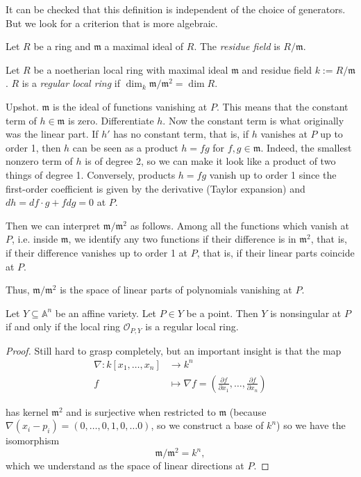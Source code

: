 \documentclass{book}
\begin{document}
\noindent
It can be checked that this definition is
independent of the choice of generators. But
we look for a criterion that is more
algebraic.

\begin{definition}
\label{definition-residue-field}
Let $R$ be a ring and $\mathfrak{m}$ a
maximal ideal of $R$.
The {\it residue field} is  $R/\mathfrak{m}$.
\end{definition}

\begin{definition}
\label{definition-regular-local-ring}
Let $R$ be a noetherian local ring with
maximal ideal $\mathfrak{m}$
and residue field $k:=R/\mathfrak{m}$.
$R$ is a {\it regular local ring} if
$\dim_k \mathfrak{m}/\mathfrak{m}^2=\dim R$.
\end{definition}

\noindent
Upshot. $\mathfrak{m}$ is the ideal of
functions vanishing at $P$.
This means that the constant term of $h \in
\mathfrak{m}$ is zero.
Differentiate $h$.
Now the constant term is what originally was
the linear part.
If $h'$ has no constant term, that is, if $h$
vanishes at $P$
up to order 1,
then $h$ can be seen as a product $h=fg$ for
$f,g \in \mathfrak{m}$.
Indeed, the smallest nonzero term of $h$ is
of degree 2,
so we can make it look like a product of two
things of degree 1.
Conversely, products $h=fg$ vanish up to
order 1 since
the first-order coefficient is given by the
derivative
(Taylor expansion)
and $dh=df\cdot g+fdg =0$ at $P$.

Then we can interpret
$\mathfrak{m}/\mathfrak{m}^2$ as follows.
Among all the functions which vanish at $P$,
i.e. inside $\mathfrak{m}$,
we identify any two functions if their
difference
is in $\mathfrak{m}^2$,
that is, if their difference vanishes up to
order 1 at $P$,
that is, if their linear parts coincide at
$P$.

Thus, $\mathfrak{m}/\mathfrak{m}^2$ is the
space
of linear parts of polynomials vanishing at
$P$.

\begin{theorem}
\label{theorem-nonsi-jacob-iff-regul-local}
Let $Y \subseteq \mathbb{A}^n$ be an affine
variety.
Let $P \in Y$ be a point.
Then $Y$ is nonsingular at $P$
if and only if
the local ring $\mathcal{O}_{P,Y}$ is a
regular local ring.
\end{theorem}

\begin{proof}
Still hard to grasp completely,
but an important insight is that the map
$$
\begin{aligned}
\nabla: k[x_1,…,x_n]  &\longrightarrow k^n \\
 f &\longmapsto \nabla f=\left(\frac{\partial
 f}{\partial x_1},
…,\frac{\partial f}{\partial x_n}\right)
\end{aligned}
$$

\noindent
has kernel $\mathfrak{m}^2$ and is surjective
when restricted to $\mathfrak{m}$
(because $\nabla(x_i-p_i)=(0,…,0,1,0,…0)$, so
we construct a base of $k^n$)
so we have the isomorphism
$$
\mathfrak{m}/\mathfrak{m}^2=k^n,
$$
which we understand as the space of linear
directions at $P$.
\end{proof}
\end{document}
